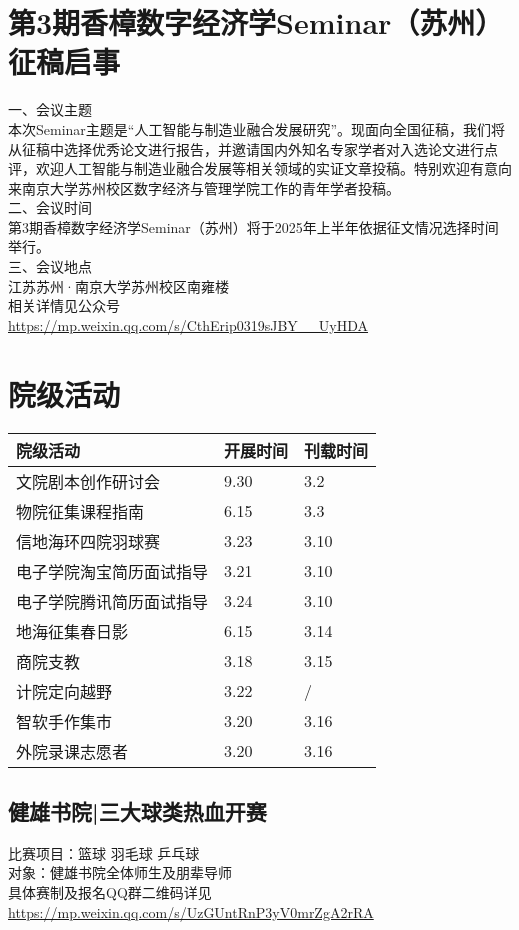 \documentclass[letterpaper, 12pt]{article}
\begin{document}
\begin{multicols}{2}
\section{第3期香樟数字经济学Seminar（苏州）征稿启事}
一、会议主题\\
本次Seminar主题是“人工智能与制造业融合发展研究”。现面向全国征稿，我们将从征稿中选择优秀论文进行报告，并邀请国内外知名专家学者对入选论文进行点评，欢迎人工智能与制造业融合发展等相关领域的实证文章投稿。特别欢迎有意向来南京大学苏州校区数字经济与管理学院工作的青年学者投稿。\\
二、会议时间\\
第3期香樟数字经济学Seminar（苏州）将于2025年上半年依据征文情况选择时间举行。\\
三、会议地点\\
江苏苏州·南京大学苏州校区南雍楼\\
相关详情见公众号\\
\url{https://mp.weixin.qq.com/s/CthErip0319sJBY__UyHDA}

\section{院级活动}
\begin{tabular}{|>{\centering\arraybackslash}m{}|m{}|m{}|}
    \hline
    院级活动 & 开展时间 & 刊载时间\\
    \hline\hline
    文院剧本创作研讨会 & 9.30 & 3.2\\
    物院征集课程指南 & 6.15 & 3.3\\
    信地海环四院羽球赛 & 3.23 & 3.10\\
    电子学院淘宝简历面试指导 & 3.21 & 3.10\\
    电子学院腾讯简历面试指导 & 3.24 & 3.10\\
    地海征集春日影 & 6.15 & 3.14\\
    商院支教 & 3.18 & 3.15\\
    计院定向越野 & 3.22 & / \\
    智软手作集市 & 3.20 & 3.16\\
    外院录课志愿者 & 3.20 & 3.16\\
    \hline
\end{tabular}
\subsection{健雄书院|三大球类热血开赛}
比赛项目：篮球 羽毛球 乒乓球\\
对象：健雄书院全体师生及朋辈导师\\
具体赛制及报名QQ群二维码详见\url{https://mp.weixin.qq.com/s/UzGUntRnP3yV0mrZgA2rRA}

\end{multicols}
\end{document}
